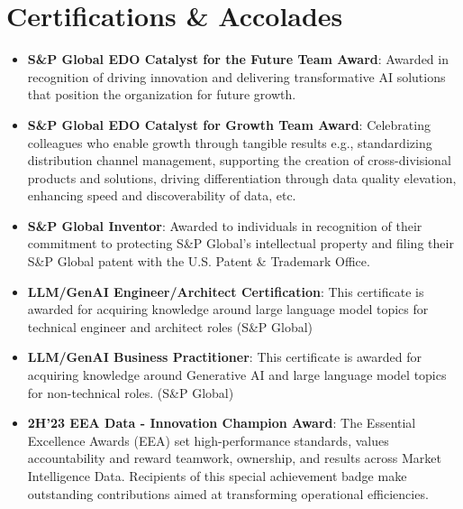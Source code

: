 \documentclass[letterpaper,11pt]{article}
\newcommand{\resumeItem}[1]{
  \item\small{
    {#1 \vspace{-2pt}}
  }
}
\newcommand{\resumeSubHeadingListStart}{\begin{itemize}[leftmargin=0.15in, label={}]}
\newcommand{\resumeSubHeadingListEnd}{\end{itemize}}
\begin{document}
\section{Certifications \& Accolades}
\resumeSubHeadingListStart
  \resumeItem{\textbf{S\&P Global EDO Catalyst for the Future Team Award}: Awarded in recognition of driving innovation and delivering transformative AI solutions that position the organization for future growth.}
    \resumeItem{\textbf{S\&P Global EDO Catalyst for Growth Team Award}: Celebrating colleagues who enable growth through tangible results e.g., standardizing distribution channel management, supporting the creation of cross-divisional products and solutions, driving differentiation through data quality elevation, enhancing speed and discoverability of data, etc.}
    \resumeItem{\textbf{S\&P Global Inventor}: Awarded to individuals in recognition of their commitment to protecting S\&P Global's intellectual property and filing their S\&P Global patent with the U.S. Patent \& Trademark Office.}
    \resumeItem{\textbf{LLM/GenAI Engineer/Architect Certification}: This certificate is awarded for acquiring knowledge around large language model topics for technical engineer and architect roles (S\&P Global)}
    \resumeItem{\textbf{LLM/GenAI Business Practitioner}: This certificate is awarded for acquiring knowledge around Generative AI and large language model topics for non-technical roles. (S\&P Global)}
    \resumeItem{\textbf{2H'23 EEA Data - Innovation Champion Award}: The Essential Excellence Awards (EEA) set high-performance standards, values accountability and reward teamwork, ownership, and results across Market Intelligence Data. Recipients of this special achievement badge make outstanding contributions aimed at transforming operational efficiencies.}
\resumeSubHeadingListEnd

\end{document}
